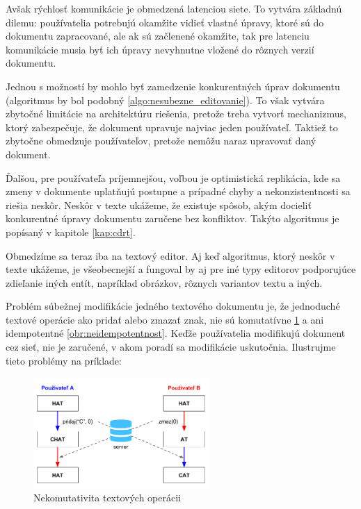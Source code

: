 Avšak rýchlosť komunikácie je obmedzená latenciou siete. To vytvára základnú dilemu: 
používatelia potrebujú okamžite vidieť vlastné úpravy, ktoré sú do dokumentu zapracované,
ale ak sú začlenené okamžite, tak pre latenciu komunikácie musia byť ich
úpravy nevyhnutne vložené do rôznych verzií dokumentu.

Jednou s možností by mohlo byť zamedzenie konkurentných úprav dokumentu (algoritmus by bol podobný
\ref{algo:nesubezne_editovanie}). To však vytvára zbytočné limitácie na architektúru riešenia,
pretože treba vytvorť mechanizmus, ktorý zabezpečuje, že dokument upravuje najviac jeden
používateľ. Taktiež to zbytočne obmedzuje používateľov, pretože nemôžu naraz
upravovať daný dokument.

Ďalšou, pre používateľa príjemnejšou, voľbou je optimistická
replikácia, kde sa zmeny v dokumente uplatňujú postupne a prípadné chyby a nekonzistentnosti sa
riešia neskôr. Neskôr v texte ukážeme, že existuje spôsob, akým docieliť konkurentné úpravy 
dokumentu zaručene bez konfliktov. Takýto algoritmus je popísaný v kapitole \ref{kap:cdrt}.

Obmedzíme sa teraz iba na textový editor. Aj keď algoritmus, ktorý neskôr v texte ukážeme, je
všeobecnejší a fungoval by aj pre iné typy editorov podporujúce zdieľanie iných entít, napríklad
obrázkov, rôznych variantov textu a iných.

\medskip

Problém súbežnej modifikácie jedného textového dokumentu je, že jednoduché textové operácie ako
pridať alebo zmazať znak, nie sú komutatívne \ref{obr:nekomutativita} a ani 
idempotentné \ref{obr:neidempotentnost}. Keďže používatelia
modifikujú dokument cez sieť, nie je zaručené, v akom poradí sa modifikácie uskutočnia. 
Ilustrujme tieto problémy na príklade:

\begin{figure}[H]
\centerline{\includegraphics[width=0.6\textwidth]{images/nekomutativne_operacie}}
\caption[Nekomutativita textových operácii]{Nekomutativita textových operácii}
\label{obr:nekomutativita}
\end{figure}

